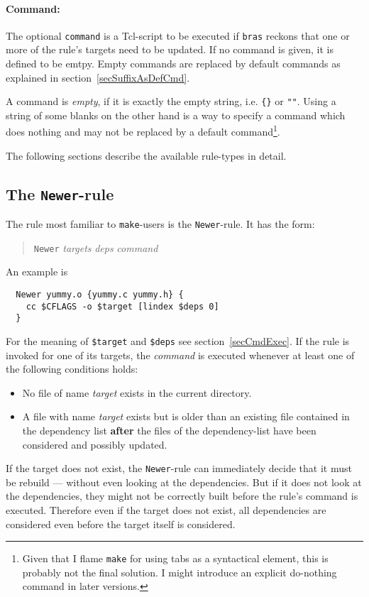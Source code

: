 \documentclass[12pt]{article}
\newcommand{\bras}{\texttt{bras}}
\newcommand{\make}{\texttt{make}}
\begin{document}
\paragraph{Command:}
The optional \texttt{command} is a Tcl-script to be executed if
\bras{} reckons that one or more of the rule's targets need to be
updated. If no command is given, it is defined to be emtpy. Empty
commands are replaced by default commands as explained in
section~\ref{secSuffixAsDefCmd}. 

A command is \textit{empty}, if it is exactly the empty string,
i.e. \verb+{}+ or \verb+""+. Using a string of some blanks on the
other hand is a way to specify a command which does nothing and may
not be replaced by a default command\footnote{Given that I flame
\make{} for using tabs as a syntactical element, this is probably not
the final solution. I might introduce an explicit do-nothing
command in later versions.}.

The following sections describe the available rule-types in detail.

\subsection{The \texttt{Newer}-rule}
\label{secNewer}
The rule most familiar to \make-users is the
\texttt{Newer}-rule. It has the form:
\begin{quote}
  \texttt{Newer} \textit{targets} \textit{deps} \textit{command}
\end{quote}
An example is
\begin{verbatim}
  Newer yummy.o {yummy.c yummy.h} {
    cc $CFLAGS -o $target [lindex $deps 0]
  }
\end{verbatim}
For the meaning of \texttt{\$target} and \texttt{\$deps} see
section~\ref{secCmdExec}. If the rule is invoked for one of its
targets, the \textit{command} is executed whenever at least one of the
following conditions holds:
\begin{itemize}
\item No file of name \textit{target} exists in the current directory.
\item A file with name \textit{target} exists but is older than an
existing file contained in the dependency list \textbf{after} the
files of the dependency-list have been considered and possibly
updated.
\end{itemize}

If the target does not exist, the \texttt{Newer}-rule can immediately
decide that it must be rebuild --- without even looking at the
dependencies. But if it does not look at the dependencies, they might
not be correctly built before the rule's command is
executed. Therefore even if the target does not exist, all
dependencies are considered even before the target itself is
considered. 
\end{document}
